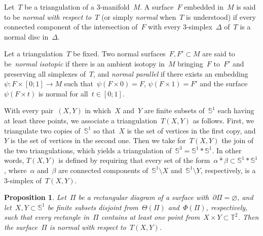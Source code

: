 \documentclass{amsart}
\theoremstyle{theorem}
\newtheorem{prop}[theo]{Proposition}
\theoremstyle{remark}
\theoremstyle{definition}
\numberwithin{equation}{section}
\numberwithin{figure}{section}
\begin{document}
Let~$T$ be a triangulation of a $3$-manifold~$M$.
A surface~$F$ embedded in~$M$ is said to be \emph{normal with respect to~$T$} (or simply \emph{normal} when~$T$
is understood) if every connected component
of the intersection of~$F$ with every $3$-simplex~$\Delta$ of~$T$ is a normal disc in~$\Delta$.

Let a triangulation~$T$ be fixed. Two normal surfaces~$F,F'\subset M$ are said to be~\emph{normal isotopic}
if there is an ambient isotopy in~$M$ bringing~$F$ to~$F'$ and preserving all simplexes of~$T$,
and \emph{normal parallel} if there exists an embedding~$\psi:F\times[0;1]\rightarrow M$
such that~$\psi(F\times 0)=F$, $\psi(F\times 1)=F'$ and the surface~$\psi(F\times t)$ is normal for all~$t\in[0;1]$.

With every pair~$(X,Y)$ in which~$X$ and~$Y$ are finite subsets of~$\mathbb S^1$ each having at least three points,
we associate a triangulation~$T(X,Y)$ as follows. First,
we triangulate two copies of~$\mathbb S^1$ so that~$X$ is the set of vertices in
the first copy, and~$Y$ is the set of vertices in the second one. Then we take for~$T(X,Y)$ the join
of the two triangulations, which yields a triangulation of~$\mathbb S^3=\mathbb S^1*\mathbb S^1$.
In other words, $T(X,Y)$ is defined by requiring that every set of
the form~$\overline{\alpha*\beta}\subset\mathbb S^1*\mathbb S^1$, where~$\alpha$
and~$\beta$ are connected components of~$\mathbb S^1\setminus X$ and~$\mathbb S^1\setminus Y$,
respectively, is a $3$-simplex of~$T(X,Y)$.

\begin{prop}\label{rect=>norm-prop}
Let~$\Pi$ be a rectangular diagram of a surface with~$\partial\Pi=\varnothing$,
and let~$X,Y\subset\mathbb S^1$ be finite subsets disjoint from~$\Theta(\Pi)$ and~$\Phi(\Pi)$, respectively,
such that every rectangle in~$\Pi$ contains at least one point from~$X\times Y\subset\mathbb T^2$. Then the surface~$\widehat\Pi$
is normal with respect to~$T(X,Y)$.
\end{prop}
\end{document}
